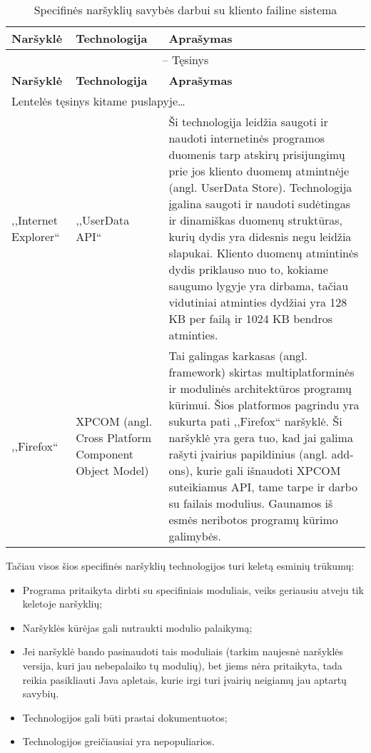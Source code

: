 \documentclass[12pt,a4paper,titlepage]{article}
\begin{document}
\begin{longtable}{|p{2cm}|p{3cm}|p{7.8cm}|}
\caption{Specifinės naršyklių savybės darbui su kliento failine sistema \label{table:naršyklės}}\\

\hline \hline
{\textbf{Naršyklė}} &
{\textbf{Technologija}} &
{\textbf{Aprašymas}}\\
\hline
\endfirsthead


\multicolumn{3}{c}{{\tablename} \thetable{} -- Tęsinys} \\[0.5ex]
\hline \hline
{\textbf{Naršyklė}} &
{\textbf{Technologija}} &
{\textbf{Aprašymas}}\\
\hline
\endhead


\multicolumn{3}{l}{{Lentelės tęsinys kitame puslapyje\ldots}} \\
\endfoot


\hline \hline
\endlastfoot
\hline 
,,Internet Explorer``
&
,,UserData API``\cite{UDA11}
&
Ši technologija leidžia saugoti ir naudoti internetinės programos duomenis tarp atskirų prisijungimų prie jos kliento duomenų atmintnėje (angl. UserData Store). Technologija įgalina saugoti ir naudoti sudėtingas ir dinamiškas duomenų struktūras, kurių dydis yra didesnis negu leidžia slapukai. Kliento duomenų atmintinės dydis priklauso nuo to, kokiame saugumo lygyje yra dirbama, tačiau vidutiniai atminties dydžiai yra 128 KB per failą ir 1024 KB bendros atminties.
\\
\hline
,,Firefox``
&
XPCOM (angl. Cross Platform Component Object Model)\cite{FIO11}
&
Tai galingas karkasas (angl. framework) skirtas multiplatforminės ir modulinės architektūros programų kūrimui. Šios platformos pagrindu yra sukurta pati ,,Firefox`` naršyklė. Ši naršyklė yra gera tuo, kad jai galima rašyti įvairius papildinius (angl. add-ons), kurie gali išnaudoti XPCOM suteikiamus API, tame tarpe ir darbo su failais modulius. Gaunamos iš esmės neribotos programų kūrimo galimybės.
\end{longtable}

Tačiau visos šios specifinės naršyklių technologijos turi keletą esminių trūkumų:
\begin{itemize}
  \item Programa pritaikyta dirbti su specifiniais moduliais, veiks geriausiu atveju tik keletoje naršyklių;
  \item Naršyklės kūrėjas gali nutraukti modulio palaikymą;
  \item Jei naršyklė bando pasinaudoti tais moduliais (tarkim naujesnė naršyklės versija, kuri jau nebepalaiko tų modulių), bet jiems nėra pritaikyta, tada reikia pasikliauti Java apletais, kurie irgi turi įvairių neigiamų jau aptartų savybių.
  \item Technologijos gali būti prastai dokumentuotos;
  \item Technologijos greičiausiai yra nepopuliarios.
\end{itemize}
\end{document}
